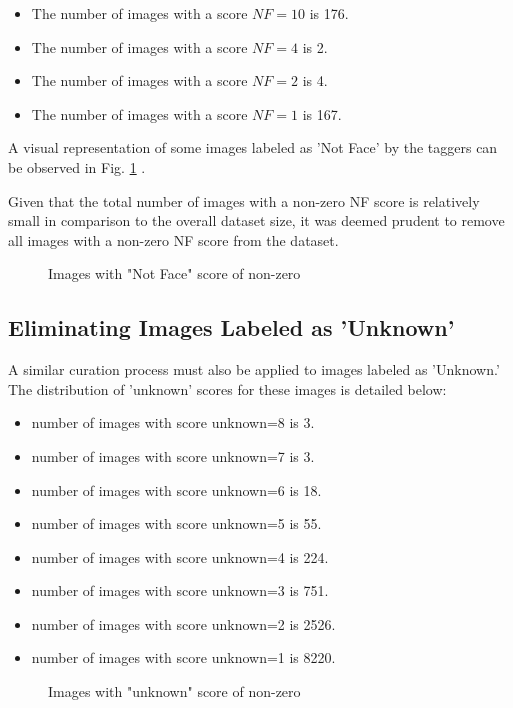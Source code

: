 \begin{itemize}
	\item The number of images with a score $NF=10$ is 176.
	\item The number of images with a score $NF=4$ is 2.
	\item The number of images with a score $NF=2$ is 4.
	\item The number of images with a score $NF=1$ is 167.
\end{itemize}

A visual representation of some images labeled as 'Not Face' by the taggers can be observed in Fig. \ref{fig:nf} .

Given that the total number of images with a non-zero NF score is relatively small in comparison to the overall dataset size, it was deemed prudent to remove all images with a non-zero NF score from the dataset.

\begin{figure}[h]
	\centering
	\subfloat[Images with NF=10]{{ }}
	\qquad
	\subfloat[Images with NF=2]{{ }}
	\caption{Images with "Not Face" score of non-zero}
	\label{fig:nf}
\end{figure}
\subsection{Eliminating Images Labeled as 'Unknown'}
A similar curation process must also be applied to images labeled as 'Unknown.' The distribution of 'unknown' scores for these images is detailed below:
\begin{itemize}
	\item number of images with score unknown=8 is  3.
	\item number of images with score unknown=7 is  3.
	\item number of images with score unknown=6 is  18.
	\item number of images with score unknown=5 is  55.
	\item number of images with score unknown=4 is  224.
	\item number of images with score unknown=3 is  751.
	\item number of images with score unknown=2 is  2526.
	\item number of images with score unknown=1 is  8220.
\end{itemize}

\begin{figure}[h]
	\centering
	\subfloat[Images with unknown=6]{{ }}
	\qquad
	\subfloat[Images with unknown=5]{{ }}
	\caption{Images with "unknown" score of non-zero}
	\label{fig:uk}
\end{figure}


